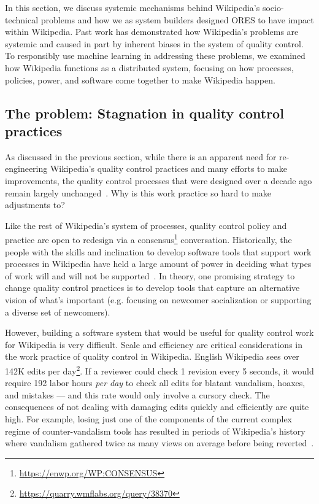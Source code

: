 In this section, we discuss systemic mechanisms behind Wikipedia's socio-technical problems and how we as system builders designed ORES to have impact within Wikipedia.  Past work has demonstrated how Wikipedia's problems are systemic and caused in part by inherent biases in the system of quality control. To responsibly use machine learning in addressing these problems, we examined how Wikipedia functions as a distributed system, focusing on how processes, policies, power, and software come together to make Wikipedia happen.

\subsection{The problem: Stagnation in quality control practices}
As discussed in the previous section, while there is an apparent need for re-engineering Wikipedia's quality control practices and many efforts to make improvements, the quality control processes that were designed over a decade ago remain largely unchanged~\cite{halfaker2014snuggle}.  Why is this work practice so hard to make adjustments to?

Like the rest of Wikipedia's system of processes, quality control policy and practice are open to redesign via a consensus\footnote{\url{https://enwp.org/WP:CONSENSUS}} conversation.  Historically, the people with the skills and inclination to develop software tools that support work processes in Wikipedia have held a large amount of power in deciding what types of work will and will not be supported~\cite{niederer2010wisdom,geiger2011lives,muller2013work,tkacz2014wikipedia,livingstone2016population}.  In theory, one promising strategy to change quality control practices is to develop tools that capture an alternative vision of what's important (e.g. focusing on newcomer socialization or supporting a diverse set of newcomers).  

However, building a software system that would be useful for quality control work for Wikipedia is very difficult.  Scale and efficiency are critical considerations in the work practice of quality control in Wikipedia.  English Wikipedia sees over 142K edits per day\footnote{\url{https://quarry.wmflabs.org/query/38370}}.  If a reviewer could check 1 revision every 5 seconds, it would require 192 labor hours \emph{per day} to check all edits for blatant vandalism, hoaxes, and mistakes --- and this rate would only involve a cursory check.  The consequences of not dealing with damaging edits quickly and efficiently are quite high.  For example, losing just one of the components of the current complex regime of counter-vandalism tools has resulted in periods of Wikipedia's history where vandalism gathered twice as many views on average before being reverted~\cite{geiger2013levee}.

